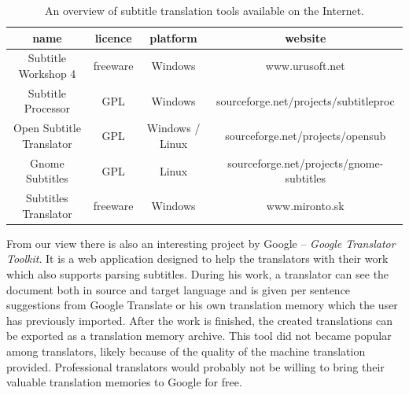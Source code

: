 \begin{table}[h]

\begin{center}
\begin{tabular}{|c|c|c|c|}
\hline
\bf name & \bf licence & \bf platform & \bf website \\
\hline
Subtitle Workshop 4 & freeware & Windows & www.urusoft.net \\
\hline
Subtitle Processor & GPL & Windows & sourceforge.net/projects/subtitleproc \\
\hline
Open Subtitle Translator & GPL & Windows / Linux & sourceforge.net/projects/opensub \\
\hline
Gnome Subtitles & GPL & Linux & sourceforge.net/projects/gnome-subtitles \\
\hline
Subtitles Translator & freeware & Windows & www.mironto.sk \\ \hline

\end{tabular}
\end{center}

\caption{An overview of subtitle translation tools available on the Internet.} \label{subtitles_tools}
\end{table}

From our view there is also an interesting project by Google -- \emph{Google Translator Toolkit}. It is a web application designed to help the translators with their work which also supports parsing subtitles. During his work, a translator can see the document both in source and target language and is given per sentence suggestions from Google Translate or his own translation memory which the user has previously imported. After the work is finished, the created translations can be exported as a translation memory archive. This tool did not became popular among translators, likely because of the quality of the machine translation provided. Professional translators would probably not be willing to bring their valuable translation memories to Google for free. 

